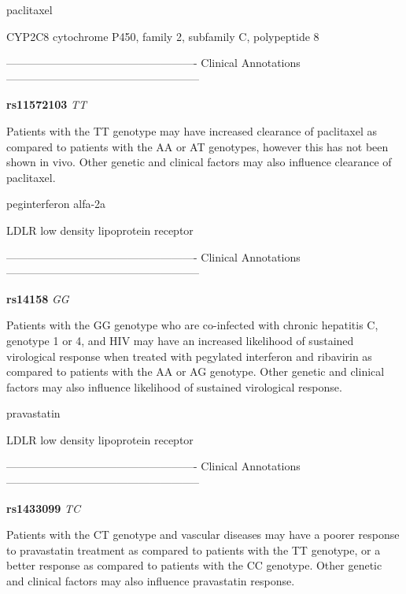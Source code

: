 \documentclass{resume} %
\begin{document}
\begin{rSection}{ paclitaxel }
\begin{rSubsection}{ CYP2C8 }{ cytochrome P450, family 2, subfamily C, polypeptide 8 }{}{}
\item[]

\item[] ---------------------------------------------------- Clinical Annotations -----------------------------------------------------\newline
\item \textbf{ rs11572103 } \textit{ TT }
\item[] Patients with the TT genotype may have increased clearance of paclitaxel as compared to patients with the AA or AT genotypes, however this has not been shown in vivo. Other genetic and clinical factors may also influence clearance of paclitaxel.
\end{rSubsection}

\end{rSection}\begin{rSection}{ peginterferon alfa-2a }
\item[]

\begin{rSubsection}{ LDLR }{ low density lipoprotein receptor }{}{}
\item[]

\item[] ---------------------------------------------------- Clinical Annotations -----------------------------------------------------\newline
\item \textbf{ rs14158 } \textit{ GG }
\item[] Patients with the GG genotype who are co-infected with chronic hepatitis C, genotype 1 or 4, and HIV may have an increased likelihood of sustained virological response when treated with pegylated interferon and ribavirin as compared to patients with the AA or AG genotype. Other genetic and clinical factors may also influence likelihood of sustained virological response. 
\end{rSubsection}

\end{rSection}\begin{rSection}{ pravastatin }
\item[]

\begin{rSubsection}{ LDLR }{ low density lipoprotein receptor }{}{}
\item[]

\item[] ---------------------------------------------------- Clinical Annotations -----------------------------------------------------\newline
\item \textbf{ rs1433099 } \textit{ TC }
\item[] Patients with the CT genotype and vascular diseases may have a poorer response to pravastatin treatment as compared to patients with the TT genotype, or a better response as compared to patients with the CC genotype. Other genetic and clinical factors may also influence pravastatin response. 
\end{rSubsection}


\end{rSection}
\end{document}
